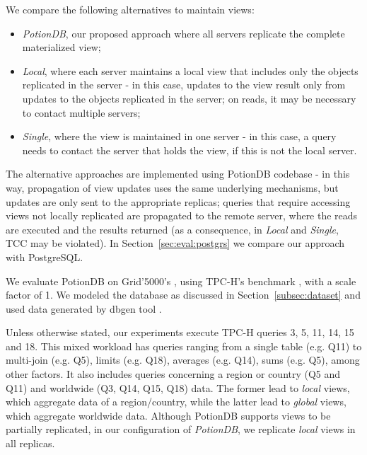 \documentclass[sigplan,twocolumn,review,anonymous]{acmart}
\begin{document}
We compare the following alternatives to maintain views:
\begin{itemize}[leftmargin=*,noitemsep,topsep=0pt,parsep=0pt,partopsep=0pt]
	\item \emph{PotionDB}, our proposed approach where all servers replicate the complete materialized view;
	\item \emph{Local}, where each server maintains a local view that includes only the objects replicated in the server - in this case, 
	updates to the view result only from updates to the objects replicated in the server; 
	on reads, it may be necessary to contact multiple servers;
	\item \emph{Single}, where the view is maintained in one server - in this case, a query needs to 
	contact the server that holds the view, if this is not the local server. 
\end{itemize}
The alternative approaches are implemented using PotionDB codebase - in this way, propagation of view updates uses the same underlying mechanisms, but updates are only sent to the appropriate replicas; queries that require accessing views not locally replicated are propagated to the remote server, where the reads are executed and the results returned (as a consequence, in \textit{Local} and \textit{Single}, TCC may be violated).
In Section~\ref{sec:eval:postgrs} we compare our approach with PostgreSQL.

We evaluate PotionDB on Grid'5000's \cite{Grid5000}, using TPC-H's benchmark \cite{tpch}, with a scale factor of 1. %
We modeled the database as discussed in Section~\ref{subsec:dataset} and used data generated by dbgen tool \cite{tpch}.

Unless otherwise stated, our experiments execute TPC-H queries 3, 5, 11, 14, 15 and 18.
This mixed workload has queries ranging from a single table (e.g. Q11) to multi-join (e.g. Q5), limits (e.g. Q18), averages (e.g. Q14), sums (e.g. Q5), 
among other factors. It also includes queries concerning a region or country (Q5 and Q11) and worldwide (Q3, Q14, Q15, Q18) data.
The former lead to \textit{local} views, which aggregate data of a region/country, while the latter lead to \textit{global} views, which aggregate worldwide data. 
Although PotionDB supports views to be partially replicated, in our configuration of \textit{PotionDB}, we replicate \textit{local} views in all replicas.
\end{document}

